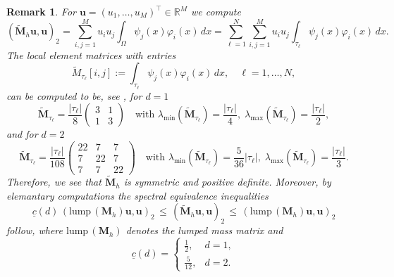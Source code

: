 \documentclass{article}
\newtheorem{remark}{Remark}
\numberwithin{equation}{section}
\begin{document}
\begin{remark}
  For $\mathbf{u}= (u_1,\ldots,u_M)^\top \in\mathbb{R}^M$ we compute 
  \begin{equation*}
    (\widetilde{\mathbf{M}}_h\mathbf{u},\mathbf{u})_2 =
    \sum_{i,j=1}^M u_iu_j\int_\Omega \psi_j(x)\varphi_i(x)\, dx =
    \sum_{\ell=1}^N \sum_{i,j=1}^M u_iu_j
    \int_{\tau_\ell} \psi_j(x)\varphi_i(x)\, dx.  
  \end{equation*}
  The local element matrices with entries
  \begin{equation*}
    \widetilde{M}_{\tau_\ell}[i,j] :=
    \int_{\tau_\ell} \psi_j(x)\varphi_i(x)\, dx,\quad \ell=1,\ldots,N,
  \end{equation*}
  can be computed to be, see \cite{Steinbach:2002}, for $d=1$
  \begin{equation*}
    \widetilde{\mathbf{M}}_{\tau_\ell} =
    \frac{|\tau_\ell|}{8}
    \begin{pmatrix}
      3 & 1\\ 1& 3
    \end{pmatrix} \quad \text{with }
    \lambda_{\text{min}}(\widetilde{\mathbf{M}}_{\tau_\ell}) =
    \frac{|\tau_\ell|}{4},\;
    \lambda_{\text{max}}(\widetilde{\mathbf{M}}_{\tau_\ell}) =
    \frac{|\tau_\ell|}{2},
  \end{equation*}
  and for $d=2$
  \begin{equation*}
    \widetilde{\mathbf{M}}_{\tau_\ell} =
    \frac{|\tau_\ell|}{108}
    \begin{pmatrix}
      22 & 7 & 7\\ 7 & 22 & 7\\ 7 & 7 & 22
    \end{pmatrix} \quad \text{with }
    \lambda_{\text{min}}(\widetilde{\mathbf{M}}_{\tau_\ell}) =
    \frac{5}{36}|\tau_\ell|,\;
    \lambda_{\text{max}}(\widetilde{\mathbf{M}}_{\tau_\ell}) =
    \frac{|\tau_\ell|}{3}. 
  \end{equation*}
  Therefore, we see that $\widetilde{\mathbf{M}}_h$ is symmetric and
  positive definite. Moreover, by elemantary computations the spectral
  equivalence inequalities
  \begin{equation}\label{Eqn:lump Masse}
    \underline{c}(d) \, (\text{lump} \,
    (\mathbf{M}_h) \mathbf{u},\mathbf{u})_2 \, \leq \,
    (\widetilde{\mathbf{M}}_h\mathbf{u},\mathbf{u})_2 \, \leq \,
    (\text{lump} \, (\mathbf{M}_h)\mathbf{u},\mathbf{u})_2 
  \end{equation}
  follow, where $\text{lump} \, (\mathbf{M}_h)$ denotes the lumped mass
  matrix and 
  \begin{equation*}
    \underline{c}(d) = \begin{cases}
      \frac{1}{2}, & d=1,\\[2mm]
      \frac{5}{12}, & d=2.
    \end{cases} 
   \end{equation*}
\end{remark}
\end{document}
